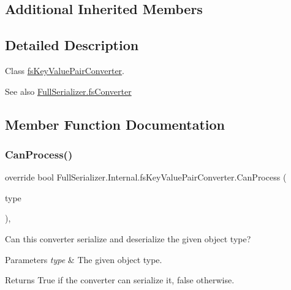 \subsection*{Additional Inherited Members}


\subsection{Detailed Description}
Class \hyperlink{class_full_serializer_1_1_internal_1_1fs_key_value_pair_converter}{fs\+Key\+Value\+Pair\+Converter}. 

\begin{DoxySeeAlso}{See also}
\hyperlink{class_full_serializer_1_1fs_converter}{Full\+Serializer.\+fs\+Converter}


\end{DoxySeeAlso}


\subsection{Member Function Documentation}
\mbox{\label{class_full_serializer_1_1_internal_1_1fs_key_value_pair_converter_acedb142bdabfb30c6cd43874734cbc33}} 
\subsubsection{\texorpdfstring{Can\+Process()}{CanProcess()}}
{\footnotesize\ttfamily override bool Full\+Serializer.\+Internal.\+fs\+Key\+Value\+Pair\+Converter.\+Can\+Process (\begin{DoxyParamCaption}\item[{Type}]{type }\end{DoxyParamCaption})\hspace{0.3cm}{\ttfamily [inline]}, {\ttfamily [virtual]}}



Can this converter serialize and deserialize the given object type? 


\begin{DoxyParams}{Parameters}
{\em type} & The given object type.\\
\hline
\end{DoxyParams}
\begin{DoxyReturn}{Returns}
True if the converter can serialize it, false otherwise.
\end{DoxyReturn}


